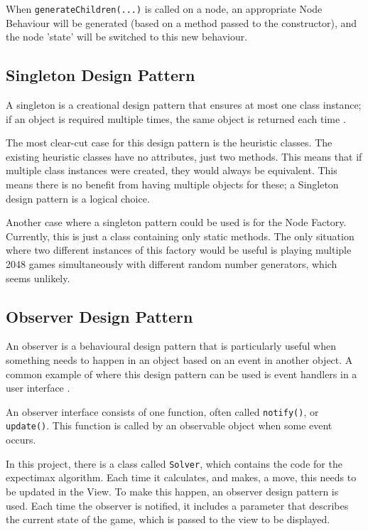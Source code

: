 \documentclass{article}
\begin{document}
When \texttt{generateChildren(...)} is called on a node, an appropriate Node Behaviour will be generated (based on a method passed to the constructor), and the node 'state' will be switched to this new behaviour.


\subsection{Singleton Design Pattern}
\label{subsec:singleton}
A singleton is a creational design pattern that ensures at most one class instance; if an object is required multiple times, the same object is returned each time \cite{CS2800_creational}.

The most clear-cut case for this design pattern is the heuristic classes. The existing heuristic classes have no attributes, just two methods. This means that if multiple class instances were created, they would
always be equivalent. This means there is no benefit from having multiple objects for these; a Singleton design pattern is a logical choice.

Another case where a singleton pattern could be used is for the Node Factory. Currently, this is just a class containing only static methods. The only situation where two different instances of this factory would be useful is playing multiple 2048 games simultaneously with different random number generators, which seems unlikely.
\subsection{Observer Design Pattern}
\label{subsec:observer}
An observer is a behavioural design pattern that is particularly useful when something needs to happen in an object based on an event in another object.
A common example of where this design pattern can be used is event handlers in a user interface \cite{CS2800_behavioural}.

An observer interface consists of one function, often called \texttt{notify()}, or \texttt{update()}. This function is called by an observable object when some event occurs.

In this project, there is a class called \texttt{Solver}, which contains the code for the expectimax algorithm. Each time it calculates, and makes, a move, this needs to be updated in the View. To make
this happen, an observer design pattern is used. Each time the observer is notified, it includes a parameter that describes the current state of the game, which is passed to the view to be displayed.
\end{document}
